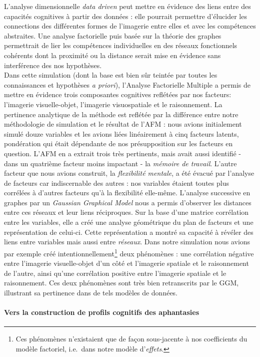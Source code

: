 \documentclass[
  12pt,
]{article}
\let\oldparagraph\paragraph
\renewcommand{\paragraph}[1]{\oldparagraph{#1}\mbox{}}
\begin{document}
L'analyse dimensionnelle \emph{data driven} peut mettre en évidence des
liens entre des capacités cognitives à partir des données : elle
pourrait permettre d'élucider les connections des différentes formes de
l'imagerie entre elles et avec les compétences abstraites. Une analyse
factorielle puis basée sur la théorie des graphes permettrait de lier
les compétences individuelles en des réseaux fonctionnels cohérents dont
la proximité ou la distance serait mise en évidence sans interférence
des nos hypothèses.\\
Dans cette simulation (dont la base est bien sûr teintée par toutes les
connaissances et hypothèses \emph{a priori}), l'Analyse Factorielle
Multiple a permis de mettre en évidence trois composantes cognitives
reflétées par nos facteurs: l'imagerie visuelle-objet, l'imagerie
visuospatiale et le raisonnement. La pertinence analytique de la méthode
est reflétée par la différence entre notre méthodologie de simulation et
le résultat de l'AFM : nous avions initialement simulé douze variables
et les avions liées linéairement à cinq facteurs latents, pondération
qui était dépendante de nos présupposition sur les facteurs en question.
L'AFM en a extrait trois très pertinents, mais avait aussi identifié -
dans un quatrième facteur moins impactant - la \emph{mémoire de
travail}. L'autre facteur que nous avions construit, la
\emph{flexibilité mentale}, a été évacué par l'analyse de facteurs car
indiscernable des autres : nos variables étaient toutes plus corrélées à
d'autres facteurs qu'à la flexibilité elle-même. L'analyse successive en
graphes par un \emph{Gaussian Graphical Model} nous a permis d'observer
les distances entre ces réseaux et leur liens réciproques. Sur la base
d'une matrice corrélation entre les variables, elle a créé une analyse
géométrique du plan de facteurs et une représentation de celui-ci. Cette
représentation a montré sa capacité à révéler des liens entre variables
mais aussi entre \emph{réseaux}. Dans notre simulation nous avions par
exemple créé intentionnellement\footnote{Ces phénomènes n'existaient que
  de façon sous-jacente à nos coefficients du modèle factoriel,
  i.e.~dans notre modèle d'\emph{effets}.} deux phénomènes : une
corrélation négative entre l'imagerie visuelle-objet d'un côté et
l'imagerie spatiale et le raisonnement de l'autre, ainsi qu'une
corrélation positive entre l'imagerie spatiale et le raisonnement. Ces
deux phénomènes sont très bien retranscrits par le GGM, illustrant sa
pertinence dans de tels modèles de données.

\hypertarget{vers-la-construction-de-profils-cognitifs-des-aphantasies}{%
\paragraph{Vers la construction de profils cognitifs des
aphantasies}\label{vers-la-construction-de-profils-cognitifs-des-aphantasies}}
\end{document}
